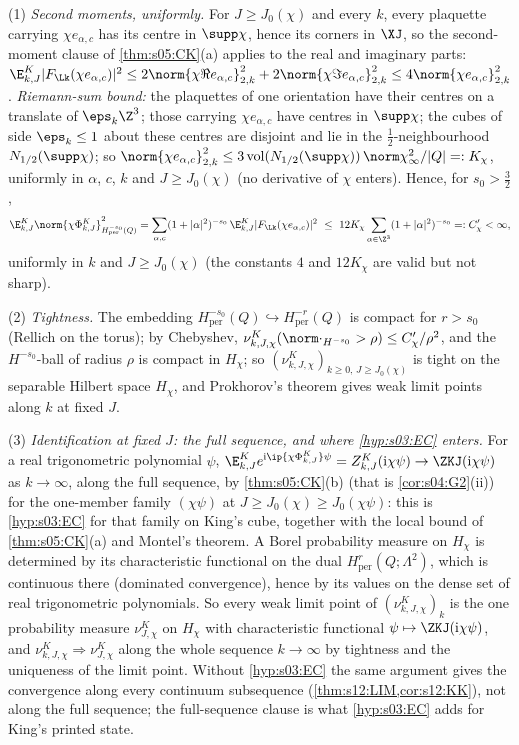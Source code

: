 (1) \emph{Second moments, uniformly.} For $J\ge J_0(\chi)$ and every $k$, every plaquette carrying $\chi e_{\alpha,c}$ has its centre in $\supp\chi$, hence its corners in $\XJ$, so the second-moment clause of \cref{thm:s05:CK}(a) applies to the real and imaginary parts: $\E^K_{k,J}|F_{\Lk}(\chi e_{\alpha,c})|^2\le2\norm{\chi\Re e_{\alpha,c}}^2_{2,k}+2\norm{\chi\Im e_{\alpha,c}}^2_{2,k}\le4\norm{\chi e_{\alpha,c}}^2_{2,k}$. \emph{Riemann-sum bound:} the plaquettes of one orientation have their centres on a translate of $\eps_k\Z^3$; those carrying $\chi e_{\alpha,c}$ have centres in $\supp\chi$; the cubes of side $\eps_k\le1$ about these centres are disjoint and lie in the $\frac12$-neighbourhood $N_{1/2}(\supp\chi)$; so $\norm{\chi e_{\alpha,c}}^2_{2,k}\le3\,\mathrm{vol}(N_{1/2}(\supp\chi))\,\norm\chi_\infty^2/|Q|=:K_\chi$, uniformly in $\alpha$, $c$, $k$ and $J\ge J_0(\chi)$ (no derivative of $\chi$ enters). Hence, for $s_0>\frac32$,
\begin{equation}\label{eq:s09:secondmoment}
\E^K_{k,J}\norm{\chi\Phi^K_{k,J}}^2_{H^{-s_0}_{\mathrm{per}}(Q)}=\sum_{\alpha,c}(1+|\alpha|^2)^{-s_0}\,\E^K_{k,J}|F_{\Lk}(\chi e_{\alpha,c})|^2\ \le\ 12K_\chi\sum_{\alpha\in\Z^3}(1+|\alpha|^2)^{-s_0}=:C'_\chi<\infty,
\end{equation}
uniformly in $k$ and $J\ge J_0(\chi)$ (the constants $4$ and $12K_\chi$ are valid but not sharp).

(2) \emph{Tightness.} The embedding $H^{-s_0}_{\mathrm{per}}(Q)\hookrightarrow H^{-r}_{\mathrm{per}}(Q)$ is compact for $r>s_0$ (Rellich on the torus); by Chebyshev, $\nu^K_{k,J,\chi}(\norm\cdot_{H^{-s_0}}>\rho)\le C'_\chi/\rho^2$, and the $H^{-s_0}$-ball of radius $\rho$ is compact in $H_\chi$; so $(\nu^K_{k,J,\chi})_{k\ge0,\,J\ge J_0(\chi)}$ is tight on the separable Hilbert space $H_\chi$, and Prokhorov's theorem \cite{Bil99} gives weak limit points along $k$ at fixed $J$.

(3) \emph{Identification at fixed $J$: the full sequence, and where \cref{hyp:s03:EC} enters.} For a real trigonometric polynomial $\psi$, $\E^K_{k,J}e^{\mathrm i\ip{\chi\Phi^K_{k,J}}\psi}=Z^K_{k,J}(\mathrm i\chi\psi)\to\ZKJ(\mathrm i\chi\psi)$ as $k\to\infty$, along the full sequence, by \cref{thm:s05:CK}(b) (that is \cref{cor:s04:G2}(ii)) for the one-member family $(\chi\psi)$ at $J\ge J_0(\chi)\ge J_0(\chi\psi)$: this is \cref{hyp:s03:EC} for that family on King's cube, together with the local bound of \cref{thm:s05:CK}(a) and Montel's theorem. A Borel probability measure on $H_\chi$ is determined by its characteristic functional on the dual $H^r_{\mathrm{per}}(Q;\Lambda^2)$, which is continuous there (dominated convergence), hence by its values on the dense set of real trigonometric polynomials. So every weak limit point of $(\nu^K_{k,J,\chi})_k$ is the one probability measure $\nu^K_{J,\chi}$ on $H_\chi$ with characteristic functional $\psi\mapsto\ZKJ(\mathrm i\chi\psi)$, and $\nu^K_{k,J,\chi}\Rightarrow\nu^K_{J,\chi}$ along the whole sequence $k\to\infty$ by tightness and the uniqueness of the limit point. Without \cref{hyp:s03:EC} the same argument gives the convergence along every continuum subsequence (\cref{thm:s12:LIM,cor:s12:KK}), not along the full sequence; the full-sequence clause is what \cref{hyp:s03:EC} adds for King's printed state.

